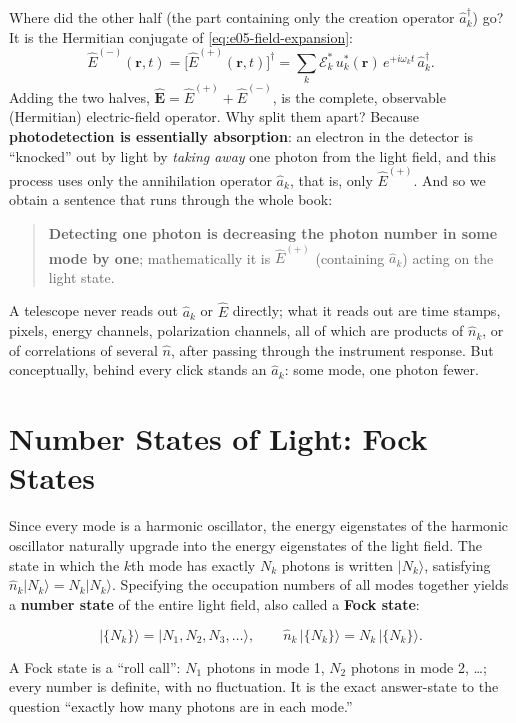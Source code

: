Where did the other half (the part containing only the creation operator \(\hat a_k^\dagger\)) go? It is the Hermitian conjugate of \eqref{eq:e05-field-expansion}:
\[
  \hat E^{(-)}(\bm r,t)=\big[\hat E^{(+)}(\bm r,t)\big]^\dagger
  =\sum_k \mathcal E_k^*\,u_k^*(\bm r)\,e^{+i\omega_k t}\,\hat a_k^\dagger .
\]
Adding the two halves, \(\hat{\bm E}=\hat E^{(+)}+\hat E^{(-)}\), is the complete, observable (Hermitian) electric-field operator. Why split them apart? Because \textbf{photodetection is essentially absorption}: an electron in the detector is ``knocked'' out by light by \emph{taking away} one photon from the light field, and this process uses only the annihilation operator \(\hat a_k\), that is, only \(\hat E^{(+)}\). And so we obtain a sentence that runs through the whole book:

\begin{quote}
\textbf{Detecting one photon is decreasing the photon number in some mode by one}; mathematically it is \(\hat E^{(+)}\) (containing \(\hat a_k\)) acting on the light state.
\end{quote}

A telescope never reads out \(\hat a_k\) or \(\hat E\) directly; what it reads out are time stamps, pixels, energy channels, polarization channels, all of which are products of \(\hat n_k\), or of correlations of several \(\hat n\), after passing through the instrument response. But conceptually, behind every click stands an \(\hat a_k\): some mode, one photon fewer.

\section{Number States of Light: Fock States}
\label{sec:e05-fock}

Since every mode is a harmonic oscillator, the energy eigenstates of the harmonic oscillator naturally upgrade into the energy eigenstates of the light field. The state in which the \(k\)th mode has exactly \(N_k\) photons is written \(|N_k\rangle\), satisfying \(\hat n_k|N_k\rangle=N_k|N_k\rangle\). Specifying the occupation numbers of all modes together yields a \textbf{number state} of the entire light field, also called a \textbf{Fock state}:

\begin{equation}
  |\{N_k\}\rangle=|N_1,N_2,N_3,\dots\rangle,
  \qquad
  \hat n_k\,|\{N_k\}\rangle=N_k\,|\{N_k\}\rangle .
  \label{eq:e05-fock}
\end{equation}
\begin{formulaexplain}
A Fock state is a ``roll call'': \(N_1\) photons in mode 1, \(N_2\) photons in mode 2, \ldots; every number is definite, with no fluctuation. It is the exact answer-state to the question ``exactly how many photons are in each mode.''
\end{formulaexplain}

